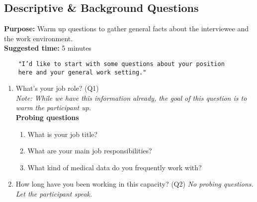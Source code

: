 \subsection{Descriptive \& Background Questions}
\textbf{Purpose:} Warm up questions to gather general facts about the interviewee and the work environment.\\
\textbf{Suggested time:} 5 minutes
\begin{verbatim}
    "I’d like to start with some questions about your position
    here and your general work setting."
\end{verbatim}
\begin{enumerate}
    \item What’s your job role? (Q1)\\
        \textit{Note: While we have this information already, the goal of this question is to warm the participant up.}\\
        \textbf{Probing questions}
            \begin{enumerate}
                \item What is your job title?
                \item What are your main job responsibilities?
                \item What kind of medical data do you frequently work with?
            \end{enumerate}
    \item How long have you been working in this capacity? (Q2)
        \textit{No probing questions. Let the participant speak.}
\end{enumerate}




